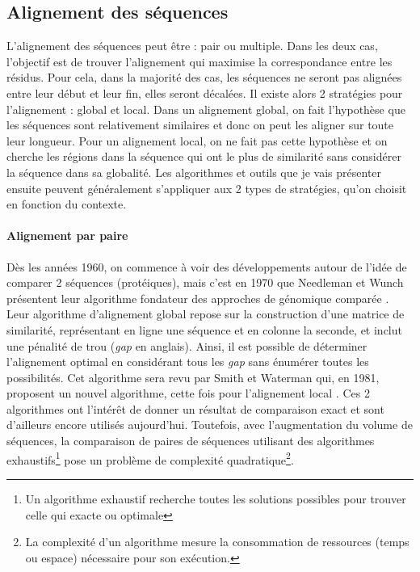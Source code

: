 \newpage
\subsection{Alignement des séquences}

L'alignement des séquences peut être : pair ou multiple. Dans les deux cas, l'objectif est de trouver l'alignement qui maximise la correspondance entre les résidus. Pour cela, dans la majorité des cas, les séquences ne seront pas alignées entre leur début et leur fin, elles seront décalées. Il existe alors 2 stratégies pour l'alignement : global et local. Dans un alignement global, on fait l'hypothèse que les séquences sont relativement similaires et donc on peut les aligner sur toute leur longueur.
Pour un alignement local, on ne fait pas cette hypothèse et on cherche les régions dans la séquence qui ont le plus de similarité sans considérer la séquence dans sa globalité. Les algorithmes et outils que je vais présenter ensuite peuvent généralement s'appliquer aux 2 types de stratégies, qu'on choisit en fonction du contexte.

\paragraph{Alignement par paire}

Dès les années 1960, on commence à voir des développements autour de l'idée de comparer 2 séquences (protéiques), mais c'est en 1970 que Needleman et Wunch présentent leur algorithme fondateur des approches de génomique comparée \cite{needleman_general_1970}. Leur algorithme d'alignement global repose sur la construction d'une matrice de similarité, représentant en ligne une séquence et en colonne la seconde, et inclut une pénalité de trou (\textit{gap} en anglais). Ainsi, il est possible de déterminer l'alignement optimal en considérant tous les \textit{gap} sans énumérer toutes les possibilités. Cet algorithme sera revu par Smith et Waterman qui, en 1981, proposent un nouvel algorithme, cette fois pour l'alignement local \cite{smith_identification_1981}. Ces 2 algorithmes ont l'intérêt de donner un résultat de comparaison exact et sont d'ailleurs encore utilisés aujourd'hui. Toutefois, avec l'augmentation du volume de séquences, la comparaison de paires de séquences utilisant des algorithmes exhaustifs\footnote{Un algorithme exhaustif recherche toutes les solutions possibles pour trouver celle qui exacte ou optimale} pose un problème de complexité quadratique\footnote{La complexité d'un algorithme mesure la consommation de ressources (temps ou espace) nécessaire pour son exécution.}.

